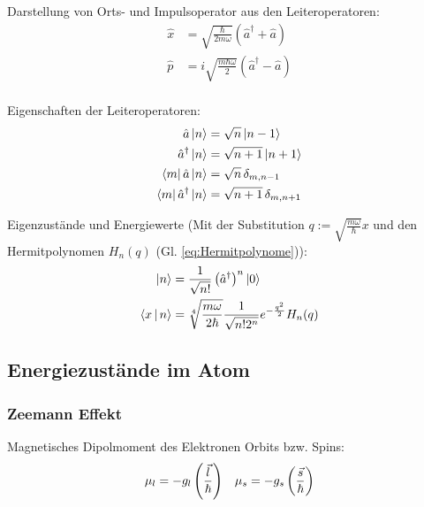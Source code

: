 \documentclass[11pt]{article}
\numberwithin{equation}{section}
\begin{document}
				\noindent
				Darstellung von Orts- und Impulsoperator aus den Leiteroperatoren:
				\begin{equation}
					\begin{aligned}
						\hat{x} &= \sqrt{\frac{\hbar}{2m\omega}}\left(\hat{a}^\dagger + \hat{a} \right) \\
						\hat{p} &= i\sqrt{\frac{m\hbar\omega}{2}}\left(\hat{a}^\dagger - \hat{a} \right) \\
					\end{aligned}
				\end{equation}

				\noindent
				Eigenschaften der Leiteroperatoren:
				\begin{equation}
					\begin{aligned}
						\hat{a}\Ket{n} &= \sqrt{n}\Ket{n-1} \\
						\hat{a}^\dagger\Ket{n} &= \sqrt{n+1}\Ket{n+1} \\
						\Bra{m}\hat{a}\Ket{n} &= \sqrt{n} \,\delta_{m,n-1} \\
						\Bra{m}\hat{a}^\dagger\Ket{n} &= \sqrt{n+1} \,\delta_{m,n+1} \\
					\end{aligned}
				\end{equation}

				\noindent
				Eigenzustände und Energiewerte (Mit der Substitution $q:=\sqrt{\frac{m\omega}{\hbar}}x$ und den Hermitpolynomen $H_n(q)$ (Gl. \ref{eq:Hermitpolynome})):
				\begin{equation}
					\begin{aligned}
						\Ket{n} &= \frac{1}{\sqrt{n!}}\left(\hat{a}^\dagger\right)^n\Ket{0} \\
						\Braket{x|n} &= \sqrt[4]{\frac{m\omega}{2\hbar}} \frac{1}{\sqrt{n! 2^n}} e^{-\frac{q^2}{2}} H_n(q) \\
					\end{aligned}
				\end{equation}

		\subsection{Energiezustände im Atom}
			\subsubsection{Zeemann Effekt}
				\noindent
				Magnetisches Dipolmoment des Elektronen Orbits bzw. Spins:
				\begin{equation}
					\begin{aligned}
						\mu_l = -g_l\left( \frac{\vec{l}}{\hbar} \right) &&
						\mu_s = -g_s\left( \frac{\vec{s}}{\hbar} \right) \\
					\end{aligned}
				\end{equation}
\end{document}

